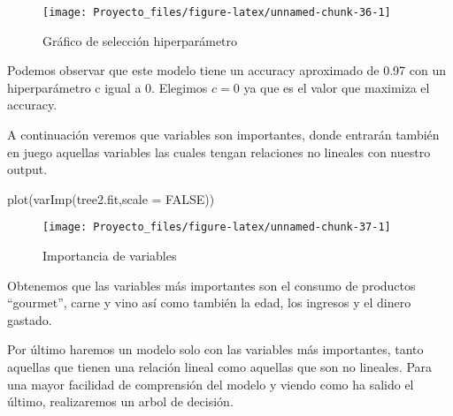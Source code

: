 \documentclass[
]{article}
\newenvironment{Shaded}{\begin{snugshade}}{\end{snugshade}}
\newcommand{\AttributeTok}[1]{\textcolor[rgb]{0.77,0.63,0.00}{#1}}
\newcommand{\ConstantTok}[1]{\textcolor[rgb]{0.00,0.00,0.00}{#1}}
\newcommand{\FunctionTok}[1]{\textcolor[rgb]{0.00,0.00,0.00}{#1}}
\newcommand{\NormalTok}[1]{#1}
\begin{document}
\begin{figure}

{\centering \texttt{[image: Proyecto\_files/figure-latex/unnamed-chunk-36-1]} 

}

\caption{Gráfico de selección hiperparámetro}\label{fig:unnamed-chunk-36}
\end{figure}

Podemos observar que este modelo tiene un accuracy aproximado de 0.97
con un hiperparámetro c igual a 0. Elegimos \(c = 0\) ya que es el valor
que maximiza el accuracy.

A continuación veremos que variables son importantes, donde entrarán
también en juego aquellas variables las cuales tengan relaciones no
lineales con nuestro output.

\begin{Shaded}
\begin{Highlighting}[]
\FunctionTok{plot}\NormalTok{(}\FunctionTok{varImp}\NormalTok{(tree2.fit,}\AttributeTok{scale =} \ConstantTok{FALSE}\NormalTok{))}
\end{Highlighting}
\end{Shaded}

\begin{figure}

{\centering \texttt{[image: Proyecto\_files/figure-latex/unnamed-chunk-37-1]} 

}

\caption{Importancia de variables}\label{fig:unnamed-chunk-37}
\end{figure}

\newpage

Obtenemos que las variables más importantes son el consumo de productos
``gourmet'', carne y vino así como también la edad, los ingresos y el
dinero gastado.

Por último haremos un modelo solo con las variables más importantes,
tanto aquellas que tienen una relación lineal como aquellas que son no
lineales. Para una mayor facilidad de comprensión del modelo y viendo
como ha salido el último, realizaremos un arbol de decisión.
\end{document}
